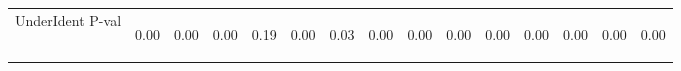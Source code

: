 \begin{center}
\begin{tabular}{lcccccccccccccc}
UnderIdent P-val & \begin{normalsize}0.00\end{normalsize} & \begin{normalsize}0.00\end{normalsize} & \begin{normalsize}0.00\end{normalsize} & \begin{normalsize}0.19\end{normalsize} & \begin{normalsize}0.00\end{normalsize} & \begin{normalsize}0.03\end{normalsize} & \begin{normalsize}0.00\end{normalsize} & \begin{normalsize}0.00\end{normalsize} & \begin{normalsize}0.00\end{normalsize} & \begin{normalsize}0.00\end{normalsize} & \begin{normalsize}0.00\end{normalsize} & \begin{normalsize}0.00\end{normalsize} & \begin{normalsize}0.00\end{normalsize} & \begin{normalsize}0.00\end{normalsize}\\

\end{tabular}
\end{center}
